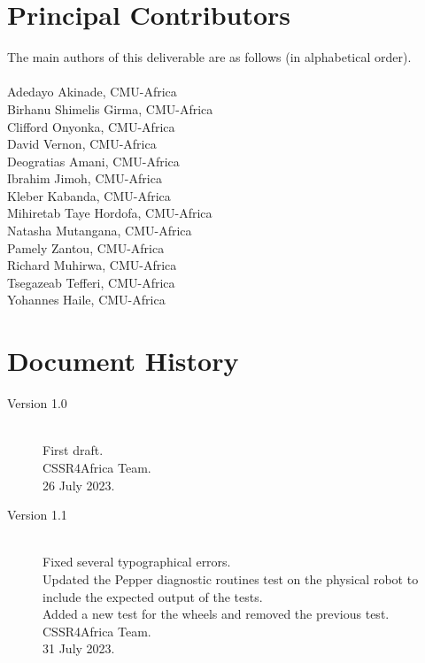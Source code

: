 \documentclass{CSSRforAfrica}
\newcommand{\blank}{~\\}
\begin{document}
{		\section*{Principal Contributors}
		\label{contributors}
		The main authors of this deliverable are as follows (in alphabetical order).
		\blank
		~
		\blank
		Adedayo Akinade, CMU-Africa\\          %
		Birhanu Shimelis Girma, CMU-Africa\\
		Clifford Onyonka, CMU-Africa\\
		David Vernon, CMU-Africa\\
		Deogratias Amani, CMU-Africa\\
		Ibrahim Jimoh, CMU-Africa\\  
		Kleber Kabanda, CMU-Africa\\ 
		Mihiretab Taye Hordofa, CMU-Africa\\ 
		Natasha Mutangana, CMU-Africa\\ 
		Pamely Zantou, CMU-Africa\\
		Richard Muhirwa, CMU-Africa\\
		Tsegazeab Tefferi, CMU-Africa\\
		Yohannes Haile, CMU-Africa\\
		
		\pagebreak
		\section*{Document History}
		\label{document_history}
		
		\begin{description}
			
			\item [Version 1.0]~\\
			First draft. \\
			CSSR4Africa Team. \\ %
			26 July 2023. %
			
			\item [Version 1.1]~\\
			Fixed several typographical errors.\\
			Updated the Pepper diagnostic routines test on the physical robot to include the expected output of the tests.\\
			Added a new test for the wheels and removed the previous test.\\
			CSSR4Africa Team.\\
			31 July 2023.
			

\end{description}}
\end{document}
